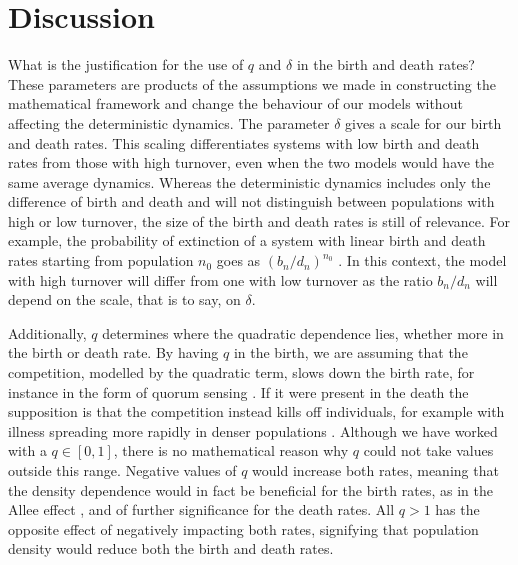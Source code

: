 \documentclass[a4paper,10pt]{article}
\numberwithin{equation}{section} %
\begin{document}
\section{Discussion}

What is the justification for the use of $q$ and $\delta$ in the birth and death rates? 
These parameters are products of the assumptions we made in constructing the mathematical framework and change the behaviour of our models without affecting the deterministic dynamics.
The parameter $\delta$ gives a scale for our birth and death rates.
This scaling differentiates systems with low birth and death rates from those with high turnover, even when the two models would have the same average dynamics. 
Whereas the deterministic dynamics includes only the difference of birth and death and will not distinguish between populations with high or low turnover, the size of the birth and death rates is still of relevance. 
For example, the probability of extinction of a system with linear birth and death rates starting from population $n_0$ goes as $(b_n/d_n)^{n_0}$ \cite{Nisbet1982}.
In this context, the model with high turnover will differ from one with low turnover as the ratio $b_n/d_n$ will depend on the scale, that is to say, on $\delta$. 

Additionally, $q$ determines where the quadratic dependence lies, whether more in the birth or death rate. 
By having $q$ in the birth, we are assuming that the competition, modelled by the quadratic term, slows down the birth rate, for instance in the form of quorum sensing \cite{Nadell2008}. %
If it were present in the death the supposition is that the competition instead kills off individuals, for example with illness spreading more rapidly in denser populations \cite{}.
Although we have worked with a $q \in [0,1]$, there is no mathematical reason why $q$ could not take values outside this range. 
Negative values of $q$ would increase both rates, meaning that the density dependence would in fact be beneficial for the birth rates, as in the Allee effect \cite{}, and of further significance for the death rates. 
All $q>1$ has the opposite effect of negatively impacting both rates, signifying that population density would reduce both the birth and death rates. %
\end{document}
